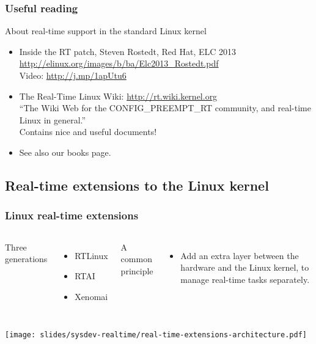 \begin{frame}
  \frametitle{Useful reading}
  About real-time support in the standard Linux kernel
  \begin{itemize}
  \item Inside the RT patch, Steven Rostedt, Red Hat, ELC 2013\\
    \url{http://elinux.org/images/b/ba/Elc2013_Rostedt.pdf}\\
    Video: \url{http://j.mp/1apUtu6}
  \item The Real-Time Linux Wiki: \url{http://rt.wiki.kernel.org}\\
    “The Wiki Web for the CONFIG\_PREEMPT\_RT community, and real-time Linux in general.”\\
    Contains nice and useful documents!
  \item See also our books page.
  \end{itemize}
\end{frame}

\subsection{Real-time extensions to the Linux kernel}

\begin{frame}
  \frametitle{Linux real-time extensions}
  \begin{columns}
    Three generations
    \begin{itemize}
    \item RTLinux
    \item RTAI
    \item Xenomai
    \end{itemize}
    A common principle
    \begin{itemize}
    \item Add an extra layer between the hardware and the Linux kernel, to manage
      real-time tasks separately.
    \end{itemize}
  \end{columns}
  \begin{center}
    \texttt{[image: slides/sysdev-realtime/real-time-extensions-architecture.pdf]}
  \end{center}
\end{frame}

